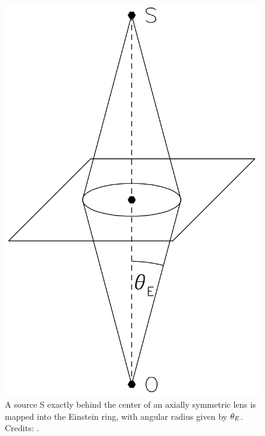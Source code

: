 \begin{figure}
    \centering
    \includegraphics[width=0.22\linewidth, keepaspectratio]{img//chapter2/einsteinring.png}
    \caption[Einstein radius]{A source S exactly behind the center of an axially symmetric lens is mapped into the Einstein ring, with angular radius given by $\theta_E$.\\\small{Credits: \cite{narayan_lectures_1997}.}}
    \label{fig:einsteinring}
\end{figure}